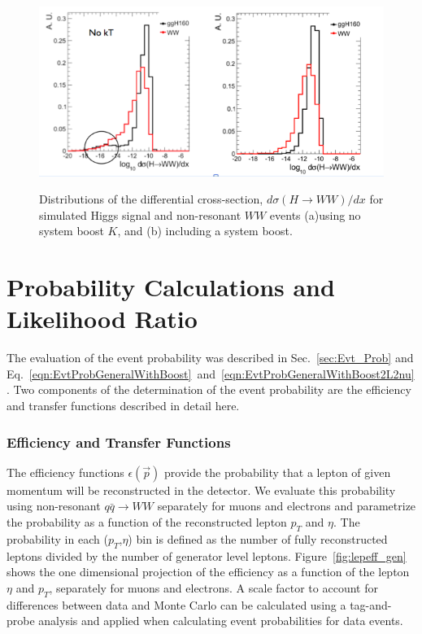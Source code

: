 \documentclass{cmspaper}
\begin{document}
\begin{figure}[!hbtp]                                                                                         
\centering                                                                                                                                             
\includegraphics[width=.84\textwidth]{figures/SystemBoostEffect.png}\\                                            
\caption{
Distributions of the differential cross-section, $d\sigma(H \rightarrow WW)/dx$ for simulated Higgs signal and non-resonant $WW$ events
(a)using no system boost $K$, and (b) including a system boost.}
\label{fig:kteffect}                                                                                          
\end{figure}          

\section{ Probability Calculations and Likelihood Ratio}
\label{sec:Probability}
The evaluation of the event probability was described in Sec.~\ref{sec:Evt_Prob} and 
Eq.~\ref{eqn:EvtProbGeneralWithBoost}~and~\ref{eqn:EvtProbGeneralWithBoost2L2nu}.
Two components of the determination of the event probability are the efficiency
and transfer functions described in detail here.

\subsubsection{Efficiency and Transfer Functions}
\label{sec:EfficiencyTransfer}
The efficiency functions $\epsilon(\vec{p})$ provide the probability that a lepton of given momentum
will be reconstructed in the detector. We evaluate this probability using non-resonant $q\bar{q}\rightarrow WW$
separately for muons and electrons and parametrize the probability as a function of the reconstructed
lepton $p_{T}$ and $\eta$.
The probability in each ($p_{T}$,$\eta$) bin is defined as the number of fully reconstructed leptons divided 
by the number of generator level leptons. Figure~\ref{fig:lepeff_gen} shows the 
one dimensional projection of the efficiency as a function of the lepton $\eta$ and $p_{T}$, separately for
muons and electrons. 
A scale factor to account for differences between 
data and Monte Carlo can be calculated using a tag-and-probe analysis and applied when calculating event 
probabilities for data events.
\end{document}
